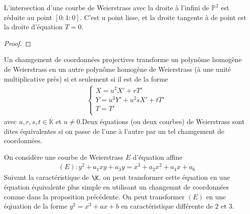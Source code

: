         \begin{prop}
            L'intersection d'une courbe de Weierstrass avec la droite à l'infini de $\mathbb{P}^2$ est réduite au point $[0 : 1 : 0]$. C'est u point lisse, et la droite tangente à de point est la droite d'équation $T = 0$.
        \end{prop}
        \begin{proof}
        \end{proof}
        \begin{prop}
            Un chamgement de coordonnées projectives transforme un polynôme homogène de Weierstrass en un autre polynôme homogène de Weierstrass (à une unité multiplicative près) si et seulement si il est de la forme
            \begin{align*}
                \begin{cases}
                    X = u^2X' + rT' \\
                    Y = u^3Y' + u^2sX' + tT' \\
                    T = T' \\
                \end{cases}
            \end{align*}
            avec $u,r,s,t \in \overline{\mathbb{K}}$ et $u \neq 0$.Deux équations (ou deux courbes) de Weierstrass sont dites équivalentes si on passe de l'une à l'autre par un tel chamgement de coordonnées.
        \end{prop}
        On considère une courbe de Weierstrass $E$ d'équation affine
        \begin{align*}
            (E) : y^2 + a_1xy + a_3y = x^3 + a_2x^2 + a_4x + a_6
        \end{align*}
        Suivant la caractéristique de $\K$, on peut transformer cette équation en une équation équivalente plus simple en utilisant un changemnt de coordonnées comme dans la proposition précédente. On peut transformer $(E)$ en une éqiuation de la forme $y^2 = x^3 + ax + b$ en caractéristique différente de $2$ et $3$.
